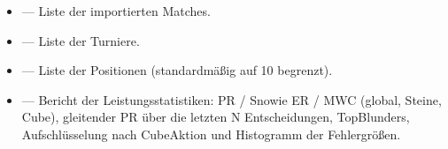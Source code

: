 \documentclass[letterpaper,10pt,german]{sphinxmanual}
\begin{document}
\sphinxAtStartPar
{}
\begin{itemize}
\item {} 
\sphinxAtStartPar
{} — Liste der importierten Matches.

\item {} 
\sphinxAtStartPar
{} — Liste der Turniere.

\item {} 
\sphinxAtStartPar
{} — Liste der Positionen (standardmäßig auf 10 begrenzt).

\item {} 
\sphinxAtStartPar
{} — Bericht der Leistungsstatistiken: PR / Snowie ER / MWC (global, Steine, Cube), gleitender PR über die letzten N Entscheidungen, Top\sphinxhyphen{}Blunders, Aufschlüsselung nach Cube\sphinxhyphen{}Aktion und Histogramm der Fehlergrößen.

\end{itemize}
\end{document}
